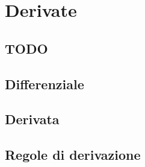 
\chapter{Derivate}

\section{TODO}

\section{Differenziale}
\label{sec:01_esponenziali}

% 

\section{Derivata}
\label{sec:02_logaritmiche}


\section{Regole di derivazione}
\label{sec:02_logaritmiche}

